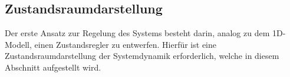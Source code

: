\subsection{Zustandsraumdarstellung}
Der erste Ansatz zur Regelung des Systems besteht darin, analog zu dem 1D-Modell, einen Zustandsregler zu entwerfen. Hierfür ist eine Zustandsraumdarstellung der Systemdynamik erforderlich, welche in diesem Abschnitt aufgestellt wird. 